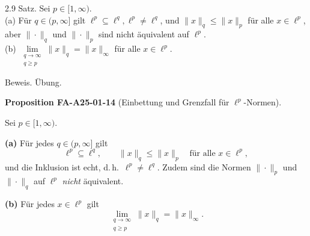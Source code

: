 \documentclass[10pt, letterpaper]{article}
\newcommand{\CustomHeading}[3]{%
  \par\medskip\noindent%
  \textbf{#1 #2} \textnormal{(#3)}.\enskip%
}
\newenvironment{PROP}[2]{\begin{unitbox}\CustomHeading{Proposition}{#1}{#2}}{\end{unitbox}}
\begin{document}
2.9 Satz. Sei $p \in[1, \infty)$.\\
(a) Für $q \in(p, \infty]$ gilt $\ell^{p} \subseteq \ell^{q}, \ell^{p} \neq \ell^{q}$, und $\|x\|_{q} \leq\|x\|_{p}$ für alle $x \in \ell^{p}$, aber $\|\cdot\|_{q}$ und $\|\cdot\|_{p}$ sind nicht äquivalent auf $\ell^{p}$.\\
(b) $\underset{\substack{q \rightarrow \infty \\ q \geq p}}{\lim }\|x\|_{q}=\|x\|_{\infty}$ für alle $x \in \ell^{p}$.

Beweis. Übung.\\




\begin{PROP}{FA-A25-01-14}{Einbettung und Grenzfall für $\ell^p$-Normen}
Sei $p\in[1,\infty)$.

\textbf{(a)} Für jedes $q\in(p,\infty]$ gilt
\[
\ell^{p}\subseteq \ell^{q},\qquad \|x\|_{q}\le \|x\|_{p}\quad\text{für alle }x\in \ell^{p},
\]
und die Inklusion ist echt, d.\,h.\ $\ell^{p}\ne \ell^{q}$. Zudem sind die Normen $\|\cdot\|_{p}$ und
$\|\cdot\|_{q}$ auf $\ell^{p}$ \emph{nicht} äquivalent.

\textbf{(b)} Für jedes $x\in \ell^{p}$ gilt
\[
\lim_{\substack{q\to\infty\\ q\ge p}}\|x\|_{q} = \|x\|_{\infty}.
\]
\end{PROP}
\end{document}
